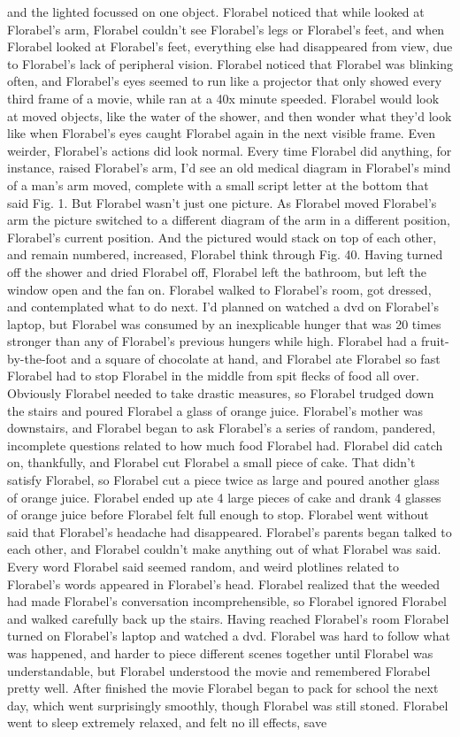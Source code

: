 \documentclass[12pt]{book}
\begin{document}
and the lighted focussed on one object. Florabel noticed that while looked at Florabel's arm, Florabel couldn't see Florabel's legs or Florabel's feet, and when Florabel looked at Florabel's feet, everything else had disappeared from view, due to Florabel's lack of peripheral vision. Florabel noticed that Florabel was blinking often, and Florabel's eyes seemed to run like a projector that only showed every third frame of a movie, while ran at a 40x minute speeded. Florabel would look at moved objects, like the water of the shower, and then wonder what they'd look like when Florabel's eyes caught Florabel again in the next visible frame. Even weirder, Florabel's actions did look normal. Every time Florabel did anything, for instance, raised Florabel's arm, I'd see an old medical diagram in Florabel's mind of a man's arm moved, complete with a small script letter at the bottom that said Fig. 1. But Florabel wasn't just one picture. As Florabel moved Florabel's arm the picture switched to a different diagram of the arm in a different position, Florabel's current position. And the pictured would stack on top of each other, and remain numbered, increased, Florabel think through Fig. 40. Having turned off the shower and dried Florabel off, Florabel left the bathroom, but left the window open and the fan on. Florabel walked to Florabel's room, got dressed, and contemplated what to do next. I'd planned on watched a dvd on Florabel's laptop, but Florabel was consumed by an inexplicable hunger that was 20 times stronger than any of Florabel's previous hungers while high. Florabel had a fruit-by-the-foot and a square of chocolate at hand, and Florabel ate Florabel so fast Florabel had to stop Florabel in the middle from spit flecks of food all over. Obviously Florabel needed to take drastic measures, so Florabel trudged down the stairs and poured Florabel a glass of orange juice. Florabel's mother was downstairs, and Florabel began to ask Florabel's a series of random, pandered, incomplete questions related to how much food Florabel had. Florabel did catch on, thankfully, and Florabel cut Florabel a small piece of cake. That didn't satisfy Florabel, so Florabel cut a piece twice as large and poured another glass of orange juice. Florabel ended up ate 4 large pieces of cake and drank 4 glasses of orange juice before Florabel felt full enough to stop. Florabel went without said that Florabel's headache had disappeared. Florabel's parents began talked to each other, and Florabel couldn't make anything out of what Florabel was said. Every word Florabel said seemed random, and weird plotlines related to Florabel's words appeared in Florabel's head. Florabel realized that the weeded had made Florabel's conversation incomprehensible, so Florabel ignored Florabel and walked carefully back up the stairs. Having reached Florabel's room Florabel turned on Florabel's laptop and watched a dvd. Florabel was hard to follow what was happened, and harder to piece different scenes together until Florabel was understandable, but Florabel understood the movie and remembered Florabel pretty well. After finished the movie Florabel began to pack for school the next day, which went surprisingly smoothly, though Florabel was still stoned. Florabel went to sleep extremely relaxed, and felt no ill effects, save 
\end{document}
